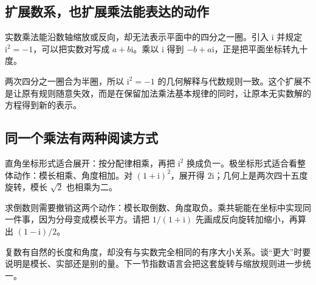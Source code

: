 \subsection*{扩展数系，也扩展乘法能表达的动作}
实数乘法能沿数轴缩放或反向，却无法表示平面中的四分之一圈。引入 $\mathrm i$ 并规定 $\mathrm i^2=-1$，可以把实数对写成 $a+b\mathrm i$。乘以 $\mathrm i$ 得到 $-b+a\mathrm i$，正是把平面坐标转九十度。

两次四分之一圈合为半圈，所以 $\mathrm i^2=-1$ 的几何解释与代数规则一致。这个扩展不是让原有规则随意失效，而是在保留加法乘法基本规律的同时，让原本无实数解的方程得到新的表示。

\subsection*{同一个乘法有两种阅读方式}
直角坐标形式适合展开：按分配律相乘，再把 $\mathrm i^2$ 换成负一。极坐标形式适合看整体动作：模长相乘、角度相加。对 $(1+\mathrm i)^2$，展开得 $2\mathrm i$；几何上是两次四十五度旋转，模长 $\sqrt2$ 也相乘为二。

求倒数则需要撤销这两个动作：模长取倒数、角度取负。乘共轭能在坐标中实现同一件事，因为分母变成模长平方。请把 $1/(1+\mathrm i)$ 先画成反向旋转加缩小，再算出 $(1-\mathrm i)/2$。

复数有自然的长度和角度，却没有与实数完全相同的有序大小关系。谈“更大”时要说明是模长、实部还是别的量。下一节指数语言会把这套旋转与缩放规则进一步统一。
